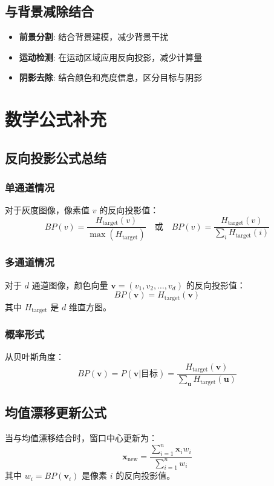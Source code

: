 \documentclass{article}
\begin{document}
\subsection{与背景减除结合}
\begin{itemize}
    \item \textbf{前景分割}: 结合背景建模，减少背景干扰
    \item \textbf{运动检测}: 在运动区域应用反向投影，减少计算量
    \item \textbf{阴影去除}: 结合颜色和亮度信息，区分目标与阴影
\end{itemize}

\section{数学公式补充}

\subsection{反向投影公式总结}

\subsubsection{单通道情况}
对于灰度图像，像素值 $v$ 的反向投影值：
\[
BP(v) = \frac{H_{\text{target}}(v)}{\max(H_{\text{target}})} \quad \text{或} \quad BP(v) = \frac{H_{\text{target}}(v)}{\sum_i H_{\text{target}}(i)}
\]

\subsubsection{多通道情况}
对于 $d$ 通道图像，颜色向量 $\mathbf{v} = (v_1, v_2, \ldots, v_d)$ 的反向投影值：
\[
BP(\mathbf{v}) = H_{\text{target}}(\mathbf{v})
\]
其中 $H_{\text{target}}$ 是 $d$ 维直方图。

\subsubsection{概率形式}
从贝叶斯角度：
\[
BP(\mathbf{v}) = P(\mathbf{v} | \text{目标}) = \frac{H_{\text{target}}(\mathbf{v})}{\sum_{\mathbf{u}} H_{\text{target}}(\mathbf{u})}
\]

\subsection{均值漂移更新公式}
当与均值漂移结合时，窗口中心更新为：
\[
\mathbf{x}_{\text{new}} = \frac{\sum_{i=1}^n \mathbf{x}_i w_i}{\sum_{i=1}^n w_i}
\]
其中 $w_i = BP(\mathbf{v}_i)$ 是像素 $i$ 的反向投影值。
\end{document}
